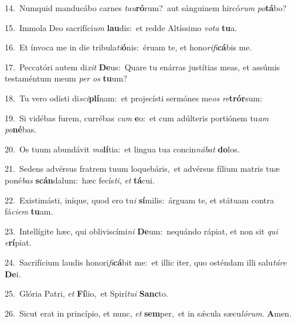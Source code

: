 {\numbfont\textcolor{\numbcolor}{14.}}~Numquid manducábo carnes \textit{tau}\-\textbf{ró}rum?~\star aut sánguinem hircó\textit{rum} \textit{po}\-\textbf{tá}bo?\par
{\numbfont\textcolor{\numbcolor}{15.}}~Immola Deo sacrifíci\textit{um} \textbf{lau}\-dis:~\star et redde Altíssimo \textit{vo}\-\textit{ta} \textbf{tu}\-a.\par
{\numbfont\textcolor{\numbcolor}{16.}}~Et ínvoca me in die tribula\-\textit{ti}\-\textbf{ó}nis:~\star éruam te, et hono\-\textit{ri}\-\textit{fi}\textbf{cá}bis me.\par
{\numbfont\textcolor{\numbcolor}{17.}}~Peccatóri autem di\textit{xit} \textbf{De}\-us:~\star Quare tu enárras justítias meas, et assúmis testaméntum meum \textit{per} \textit{os} \textbf{tu}\-um?\par
{\numbfont\textcolor{\numbcolor}{18.}}~Tu vero odísti di\-\textit{sci}\-\textbf{plí}nam:~\star et projecísti sermónes me\textit{os} \textit{re}\-\textbf{trór}sum:\par
{\numbfont\textcolor{\numbcolor}{19.}}~Si vidébas furem, currébas \textit{cum} \textbf{e}\-o:~\star et cum adúlteris portiónem tu\textit{am} \textit{po}\-\textbf{né}bas.\par
{\numbfont\textcolor{\numbcolor}{20.}}~Os tuum abundávit \textit{ma}\-\textbf{lí}tia:~\star et lingua tua concin\-\textit{ná}\-\textit{bat} \textbf{do}\-los.\par
{\numbfont\textcolor{\numbcolor}{21.}}~Sedens advérsus fratrem tuum loquebáris,~\dagger et advérsus fílium matris tuæ poné\textit{bas} \textbf{scán}\-dalum:~\star hæc fecís\-\textit{ti}\-, \textit{et} \textbf{tá}\-cui.\par
{\numbfont\textcolor{\numbcolor}{22.}}~Existimásti, iníque, quod ero tu\textit{i} \textbf{sí}\-milis:~\star árguam te, et státuam contra fá\-\textit{ci}\-\textit{em} \textbf{tu}\-am.\par
{\numbfont\textcolor{\numbcolor}{23.}}~Intellígite hæc, qui obliviscími\textit{ni} \textbf{De}\-um:~\star nequándo rápiat, et non sit \textit{qui} \textit{e}\-\textbf{rí}piat.\par
{\numbfont\textcolor{\numbcolor}{24.}}~Sacrifícium laudis honori\-\textit{fi}\-\textbf{cá}bit me:~\star et illic iter, quo osténdam illi salu\-\textit{tá}\-\textit{re} \textbf{De}\-i.\par
{\numbfont\textcolor{\numbcolor}{25.}}~Glória Patri, \textit{et} \textbf{Fí}\-lio,~\star et Spirí\-\textit{tu}\-\textit{i} \textbf{Sanc}\-to.\par
{\numbfont\textcolor{\numbcolor}{26.}}~Sicut erat in princípio, et nunc, \textit{et} \textbf{sem}\-per,~\star et in sǽcula sæcu\-\textit{ló}\-\textit{rum}. \textbf{A}\-men.\par
